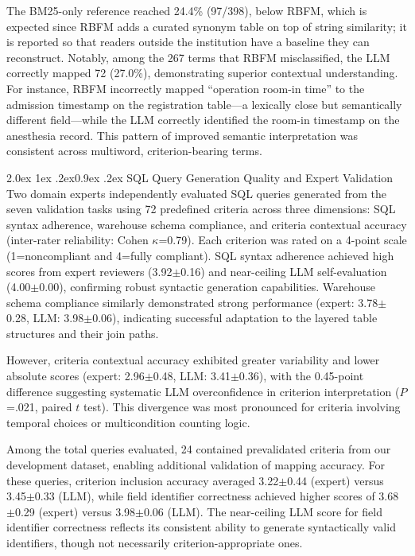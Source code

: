 \documentclass[10pt]{article}
\makeatletter
\renewcommand\subsection{\@startsection{subsection}{2}{\z@}%
  {2.0ex \@plus 1ex \@minus .2ex}{0.9ex \@plus .2ex}%
  {\normalfont\normalsize\bfseries}}
\makeatother
\begin{document}
The BM25-only reference reached 24.4\% (97/398), below RBFM, which is expected since RBFM adds a curated synonym table on top of string similarity; it is reported so that readers outside the institution have a baseline they can reconstruct. Notably, among the 267 terms that RBFM misclassified, the LLM correctly mapped 72 (27.0\%), demonstrating superior contextual understanding. For instance, RBFM
incorrectly mapped ``operation room-in time'' to the admission timestamp on the
registration table---a lexically close but semantically different field---while
the LLM correctly identified the room-in timestamp on the anesthesia record.
This pattern of improved semantic interpretation was consistent across
multiword, criterion-bearing terms.

\subsection{SQL Query Generation Quality and Expert Validation}
Two domain experts independently evaluated SQL queries generated from the seven
validation tasks using 72 predefined criteria across three dimensions: SQL
syntax adherence, warehouse schema compliance, and criteria contextual accuracy
(inter-rater reliability: Cohen $\kappa$=0.79). Each criterion was rated on a
4-point scale (1=noncompliant and 4=fully compliant). SQL syntax adherence
achieved high scores from expert reviewers (3.92$\pm$0.16) and near-ceiling LLM self-evaluation (4.00$\pm$0.00), confirming robust syntactic generation
capabilities. Warehouse schema compliance similarly demonstrated strong
performance (expert: 3.78$\pm$0.28, LLM: 3.98$\pm$0.06), indicating successful
adaptation to the layered table structures and their join paths.

However, criteria contextual accuracy exhibited greater variability and lower
absolute scores (expert: 2.96$\pm$0.48, LLM: 3.41$\pm$0.36), with the 0.45-point difference suggesting systematic LLM overconfidence in criterion
interpretation ($P$=.021, paired $t$ test). This divergence was most pronounced
for criteria involving temporal choices or multicondition counting logic.

Among the total queries evaluated, 24 contained prevalidated criteria from our
development dataset, enabling additional validation of mapping accuracy. For
these queries, criterion inclusion accuracy averaged 3.22$\pm$0.44 (expert) versus 3.45$\pm$0.33 (LLM), while field identifier correctness achieved higher scores of 3.68$\pm$0.29 (expert) versus 3.98$\pm$0.06 (LLM).
The near-ceiling LLM score for field identifier correctness reflects its consistent
ability to generate syntactically valid identifiers, though not necessarily
criterion-appropriate ones.
\end{document}
